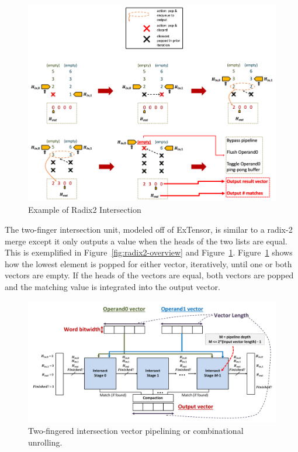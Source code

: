 \begin{figure}[H]
    \centering
    \includegraphics[width=\linewidth]{figures/radix2_intersect_example.png}
    \caption{Example of Radix2 Intersection}
    \label{fig:radix2-example}
\end{figure}

The two-finger intersection unit, modeled off of ExTensor\cite{extensor}, is similar to a radix-2 merge except it only outputs a value when the heads of the two lists are equal. This is exemplified in Figure~\ref{fig:radix2-overview} and Figure~\ref{fig:radix2-example}. Figure~\ref{fig:radix2-example} shows how the lowest element is popped for either vector, iteratively, until one or both vectors are empty. If the heads of the vectors are equal, both vectors are popped and the matching value is integrated into the output vector.

\begin{figure}[H]
    \centering
    \includegraphics[width=\linewidth]{figures/two_finger_merge_pipeline.pdf}
    \caption{Two-fingered intersection vector pipelining or combinational unrolling.}
    \label{fig:radix_2_vector pipeline}
\end{figure}


